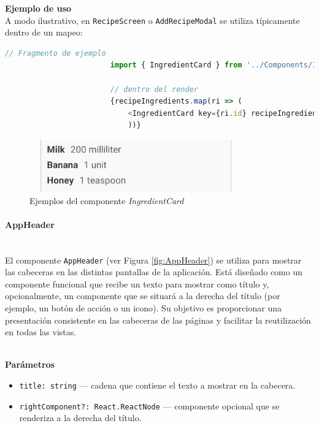 \documentclass[twoside, openright, 11pt]{report}
\begin{document}
					\textbf{Ejemplo de uso\\}
					A modo ilustrativo, en \texttt{RecipeScreen} o \texttt{AddRecipeModal} se utiliza típicamente dentro de un mapeo:
					
					\begin{lstlisting}[language=TypeScript]
						// Fragmento de ejemplo
						import { IngredientCard } from '../Components/IngredientCard';
						
						// dentro del render
						{recipeIngredients.map(ri => (
							<IngredientCard key={ri.id} recipeIngredient={ri} />
							))}
					\end{lstlisting}
					
					\begin{figure}[H]
						\centering
						\includegraphics{imagenes/IngredientCard}
						\caption{Ejemplos del componente \textit{IngredientCard}}
						\label{fig:IngredientCard}
					\end{figure}
				
					
					\paragraph{AppHeader\\\\}
					
					\label{AppHeader}
					
					El componente \texttt{AppHeader} (ver Figura \ref{fig:AppHeader}) se utiliza para mostrar las cabeceras en las distintas pantallas de la aplicación. Está diseñado como un componente funcional que recibe un texto para mostrar como título y, opcionalmente, un componente que se situará a la derecha del título (por ejemplo, un botón de acción o un icono). Su objetivo es proporcionar una presentación consistente en las cabeceras de las páginas y facilitar la reutilización en todas las vistas. 
					
					\textbf{\\Parámetros\\}
					
					\begin{itemize}
						\item \texttt{title: string} — cadena que contiene el texto a mostrar en la cabecera.
						\item \texttt{rightComponent?: React.ReactNode} — componente opcional que se renderiza a la derecha del título.
					\end{itemize}
					
\end{document}
